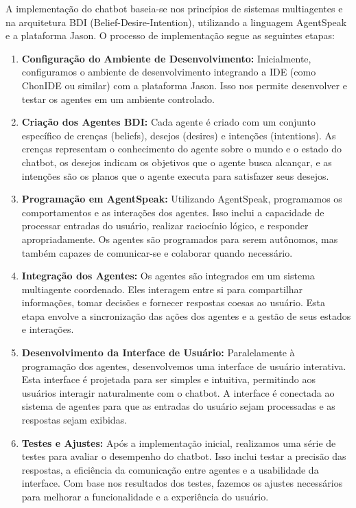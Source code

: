 \documentclass[12pt]{article}
\begin{document}
    A implementação do chatbot baseia-se nos princípios de sistemas multiagentes e na arquitetura BDI (Belief-Desire-Intention), utilizando a linguagem AgentSpeak e a plataforma Jason. O processo de implementação segue as seguintes etapas:

    \begin{enumerate}
        \item \textbf{Configuração do Ambiente de Desenvolvimento:} Inicialmente, configuramos o ambiente de desenvolvimento integrando a IDE (como ChonIDE ou similar) com a plataforma Jason. Isso nos permite desenvolver e testar os agentes em um ambiente controlado.

        \item \textbf{Criação dos Agentes BDI:} Cada agente é criado com um conjunto específico de crenças (beliefs), desejos (desires) e intenções (intentions). As crenças representam o conhecimento do agente sobre o mundo e o estado do chatbot, os desejos indicam os objetivos que o agente busca alcançar, e as intenções são os planos que o agente executa para satisfazer seus desejos.

        \item \textbf{Programação em AgentSpeak:} Utilizando AgentSpeak, programamos os comportamentos e as interações dos agentes. Isso inclui a capacidade de processar entradas do usuário, realizar raciocínio lógico, e responder apropriadamente. Os agentes são programados para serem autônomos, mas também capazes de comunicar-se e colaborar quando necessário.

        \item \textbf{Integração dos Agentes:} Os agentes são integrados em um sistema multiagente coordenado. Eles interagem entre si para compartilhar informações, tomar decisões e fornecer respostas coesas ao usuário. Esta etapa envolve a sincronização das ações dos agentes e a gestão de seus estados e interações.

        \item \textbf{Desenvolvimento da Interface de Usuário:} Paralelamente à programação dos agentes, desenvolvemos uma interface de usuário interativa. Esta interface é projetada para ser simples e intuitiva, permitindo aos usuários interagir naturalmente com o chatbot. A interface é conectada ao sistema de agentes para que as entradas do usuário sejam processadas e as respostas sejam exibidas.

        \item \textbf{Testes e Ajustes:} Após a implementação inicial, realizamos uma série de testes para avaliar o desempenho do chatbot. Isso inclui testar a precisão das respostas, a eficiência da comunicação entre agentes e a usabilidade da interface. Com base nos resultados dos testes, fazemos os ajustes necessários para melhorar a funcionalidade e a experiência do usuário.

    \end{enumerate}
\end{document}
